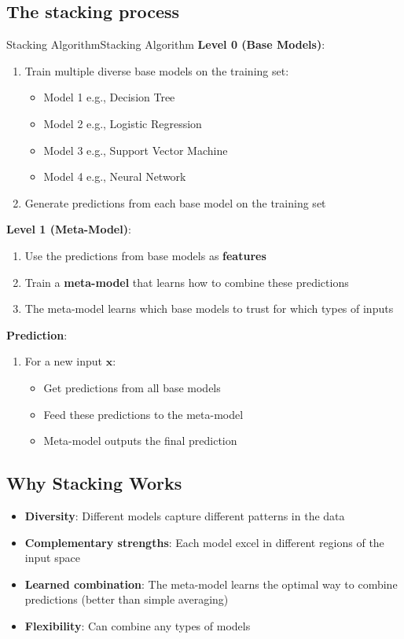 \documentclass[a4paper]{article}
\theoremstyle{definition}
\begin{document}
\subsection{The stacking process}
\begin{definition}{Stacking Algorithm}{Stacking Algorithm}
\textbf{Level 0 (Base Models)}:
\begin{enumerate}
    \item Train multiple diverse base models on the training set:
    \begin{itemize}
        \item Model 1 e.g., Decision Tree 
        \item Model 2 e.g., Logistic Regression 
        \item Model 3 e.g., Support Vector Machine 
        \item Model 4 e.g., Neural Network
    \end{itemize}
    \item Generate predictions from each base model on the training set
\end{enumerate}
\textbf{Level 1 (Meta-Model)}:
\begin{enumerate}
    \item Use the predictions from base models as \textbf{features}
    \item Train a \textbf{meta-model} that learns how to combine these predictions 
    \item The meta-model learns which base models to trust for which types of inputs
\end{enumerate}
\textbf{Prediction}:
\begin{enumerate}
    \item For a new input \( \mathbf{x} \):
    \begin{itemize}
        \item Get predictions from all base models 
        \item Feed these predictions to the meta-model 
        \item Meta-model outputs the final prediction
    \end{itemize}
\end{enumerate}
\end{definition}
\subsection{Why Stacking Works}
\begin{itemize}
    \item \textbf{Diversity}: Different models capture different patterns in the data 
    \item \textbf{Complementary strengths}: Each model excel in different regions of the input space 
    \item \textbf{Learned combination}: The meta-model learns the optimal way to combine predictions (better than simple averaging)
    \item \textbf{Flexibility}: Can combine any types of models
\end{itemize}
\end{document}
